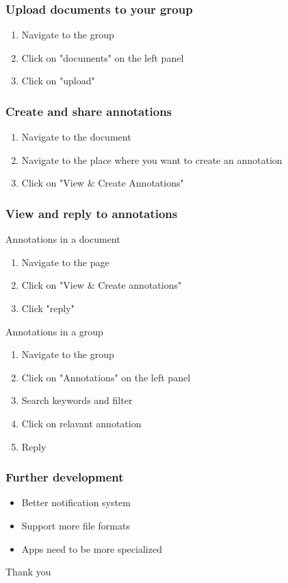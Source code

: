 \documentclass{beamer}
\begin{document}
\begin{frame}
\frametitle{Upload documents to your group}
\begin{enumerate}
\item Navigate to the group
\item Click on "documents" on the left panel
\item Click on "upload"
\end{enumerate}
\end{frame}

\begin{frame}
\frametitle{Create and share annotations}
\begin{enumerate}
\item Navigate to the document
\item Navigate to the place where you want to create an annotation
\item Click on "View \& Create Annotations" 
\end{enumerate}

\end{frame}

\begin{frame}
\frametitle{View and reply to annotations}
\begin{block}{Annotations in a document}
\begin{enumerate}
\item Navigate to the page 
\item Click on "View \& Create annotations"
\item Click "reply"
\end{enumerate}

\end{block}


\begin{block}{Annotations in a group}
\begin{enumerate}
\item Navigate to the group
\item Click on "Annotations" on the left panel
\item Search keywords and filter
\item Click on relavant annotation
\item Reply
\end{enumerate}
\end{block}

\end{frame}



\begin{frame}
\frametitle{Further development}

\begin{itemize}
\item Better notification system
\item Support more file formats
\item Apps need to be more specialized
\end{itemize}

\end{frame}

\begin{frame}
\centering \Large
Thank you
\end{frame}
\end{document}
